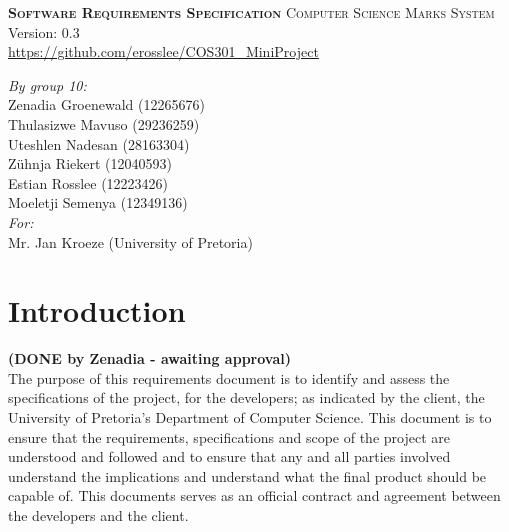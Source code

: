 \documentclass[11pt,a4paper]{article}
\begin{document}
\begin{titlepage}
\begin{center}

\textsc{\LARGE \bf{Software Requirements Specification}}
\textsc{\LARGE Computer Science Marks System}\\

\small Version: 0.3\\ \url{https://github.com/erosslee/COS301_MiniProject}

\vspace{0.5cm}
\textit{By group 10:}\\
Zenadia Groenewald (12265676)\\
Thulasizwe Mavuso (29236259)\\
Uteshlen Nadesan (28163304)\\
Z\"uhnja Riekert (12040593)\\
Estian Rosslee (12223426)\\
Moeletji Semenya (12349136)\\

\vspace{0.5cm}
\textit{For:} \\
Mr. Jan Kroeze (University of Pretoria)

\end{center}
\end{titlepage}
\newpage

\thispagestyle{empty}
\tableofcontents
\newpage

\setcounter{page}{1}
\pagestyle{plain}
\section{Introduction}
\textbf{(DONE by Zenadia - awaiting approval)}\\
The purpose of this requirements document is to identify and assess the specifications of the project, for the developers; as indicated by the client, the University of Pretoria’s Department of Computer Science. 
This document is to ensure that the requirements, specifications and scope of the project are understood and followed and to ensure that any and all parties involved understand the implications and understand what the final product should be capable of. This documents serves as an official contract and agreement between the developers and the client.
\end{document}
